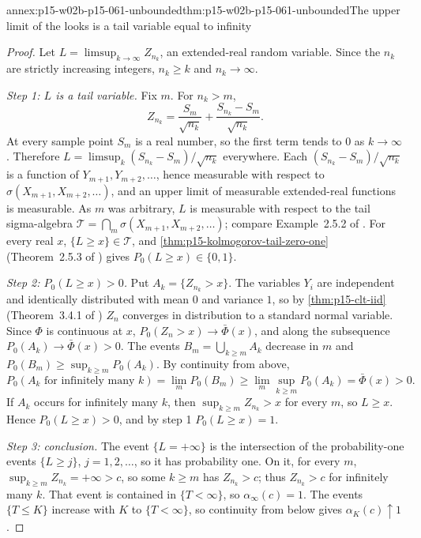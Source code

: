 \begin{annexitem}{annex:p15-w02b-p15-061-unbounded}{thm:p15-w02b-p15-061-unbounded}{The upper limit of the looks is a tail variable equal to infinity}
\begin{proof}
Let \(L=\limsup_{k\to\infty}Z_{n_k}\), an extended-real random variable.
Since the \(n_k\) are strictly increasing integers, \(n_k\geq k\) and
\(n_k\to\infty\).

\emph{Step 1: \(L\) is a tail variable.} Fix \(m\). For \(n_k>m\),
\[
 Z_{n_k}=\frac{S_m}{\sqrt{n_k}}+\frac{S_{n_k}-S_m}{\sqrt{n_k}} .
\]
At every sample point \(S_m\) is a real number, so the first term tends
to \(0\) as \(k\to\infty\). Therefore
\(L=\limsup_k(S_{n_k}-S_m)/\sqrt{n_k}\) everywhere. Each
\((S_{n_k}-S_m)/\sqrt{n_k}\) is a function of
\(Y_{m+1},Y_{m+2},\ldots\), hence measurable with respect to
\(\sigma(X_{m+1},X_{m+2},\ldots)\), and an
upper limit of measurable extended-real functions is measurable. As
\(m\) was arbitrary, \(L\) is measurable with respect to the tail
sigma-algebra \(\mathcal T=\bigcap_m\sigma(X_{m+1},X_{m+2},\ldots)\);
compare Example~2.5.2 of \cite[p.~81]{DurrettPTEAuthor2019}. For every
real \(x\), \(\{L\geq x\}\in\mathcal T\), and
\cref{thm:p15-kolmogorov-tail-zero-one} (Theorem~2.5.3 of
\cite[p.~81]{DurrettPTEAuthor2019}) gives
\(P_0(L\geq x)\in\{0,1\}\).

\emph{Step 2: \(P_0(L\geq x)>0\).} Put \(A_k=\{Z_{n_k}>x\}\). The
variables \(Y_i\) are independent and identically distributed with mean
\(0\) and variance \(1\), so by \cref{thm:p15-clt-iid} (Theorem~3.4.1 of
\cite[p.~144]{DurrettPTEAuthor2019}) \(Z_n\) converges in distribution to
a standard normal variable. Since \(\Phi\) is continuous at \(x\),
\(P_0(Z_n>x)\to\bar\Phi(x)\), and along the subsequence
\(P_0(A_k)\to\bar\Phi(x)>0\). The events
\(B_m=\bigcup_{k\geq m}A_k\) decrease in \(m\) and
\(P_0(B_m)\geq\sup_{k\geq m}P_0(A_k)\). By continuity from above,
\[
 P_0(A_k\text{ for infinitely many }k)=\lim_mP_0(B_m)
 \geq\lim_m\sup_{k\geq m}P_0(A_k)=\bar\Phi(x)>0 .
\]
If \(A_k\) occurs for infinitely many \(k\), then
\(\sup_{k\geq m}Z_{n_k}>x\) for every \(m\), so \(L\geq x\). Hence
\(P_0(L\geq x)>0\), and by step 1 \(P_0(L\geq x)=1\).

\emph{Step 3: conclusion.} The event \(\{L=+\infty\}\) is the
intersection of the probability-one events \(\{L\geq j\}\),
\(j=1,2,\ldots\), so it has probability one. On it, for every \(m\),
\(\sup_{k\geq m}Z_{n_k}=+\infty>c\), so some \(k\geq m\) has
\(Z_{n_k}>c\); thus \(Z_{n_k}>c\) for infinitely many \(k\). That event
is contained in \(\{T<\infty\}\), so \(\alpha_\infty(c)=1\). The events
\(\{T\leq K\}\) increase with \(K\) to \(\{T<\infty\}\), so continuity
from below gives \(\alpha_K(c)\uparrow1\).
\end{proof}
\end{annexitem}

